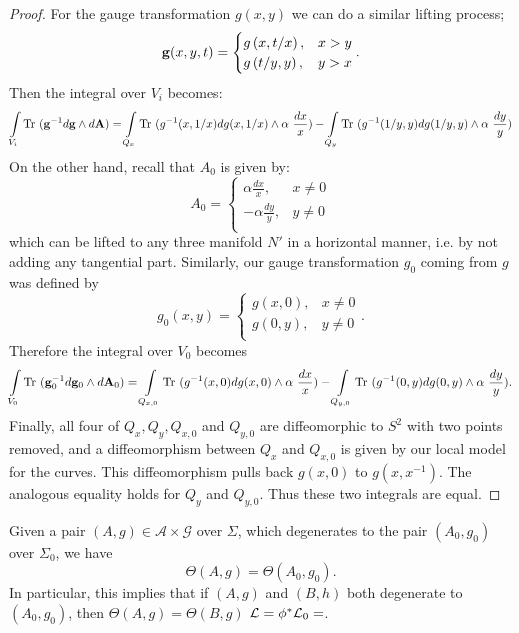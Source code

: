 \begin{proof}
		For the gauge transformation $g(x,y)$ we can do a similar lifting process;
		\begin{equation}
			\mathbf{g}(x,y,t) =\begin{cases}
			g\left(x,t/x\right), & x>y\\
			g\left(t/y,y\right), & y>x\\
			\end{cases}.
		\end{equation}
		Then the integral over $V_i$ becomes:
		\begin{align*}
			\int\limits_{V_i} \text{Tr }(\mathbf{g}^{-1}d\mathbf{g}\wedge d\mathbf{A}) = \int\limits_{Q_x} \text{Tr }(g^{-1}(x,1/x)dg(x,1/x)\wedge \alpha~ \frac{dx}{x}) - \int\limits_{Q_y} \text{Tr }(g^{-1}(1/y,y)dg(1/y,y)\wedge \alpha~ \frac{dy}{y})
		\end{align*}
		On the other hand, recall that $A_0$ is given by:
		\begin{equation}
			A_0 = \begin{cases}
			\alpha \frac{dx}{x}, & x\neq 0\\
			-\alpha \frac{dy}{y}, & y\neq 0\\
			\end{cases}
		\end{equation}
		which can be lifted to any three manifold $N'$ in a horizontal manner, i.e. by not adding any tangential part. Similarly, our gauge transformation $g_0$ coming from $g$ was defined by 
		\begin{equation}
		g_0(x,y) =\begin{cases}
		g\left(x,0\right), & x\neq 0\\
		g\left(0,y\right), & y \neq 0 \\
		\end{cases}.
		\end{equation}
		Therefore the integral over $V_0$ becomes
		\begin{align*}
		\int\limits_{V_0} \text{Tr }(\mathbf{g}_0^{-1}d\mathbf{g}_0\wedge d\mathbf{A}_0) = \int\limits_{Q_{x,0}} \text{Tr }(g^{-1}(x,0)dg(x,0)\wedge \alpha~ \frac{dx}{x}) - \int\limits_{Q_{y,0}} \text{Tr }(g^{-1}(0,y)dg(0,y)\wedge \alpha~ \frac{dy}{y}).
		\end{align*}
		Finally, all four of $Q_x,Q_y, Q_{x,0}$ and $Q_{y,0}$ are diffeomorphic to $S^2$ with two points removed, and a diffeomorphism between $Q_x$ and $Q_{x,0}$ is given by our local model for the curves. This diffeomorphism pulls back $g(x,0)$ to $g(x,x^{-1})$. The analogous equality holds for $Q_y$ and $Q_{y,0}$. Thus these two integrals are equal.
	\end{proof}
	\begin{theorem}
		Given a pair $(A,g) \in \mathcal{A}\times\mathcal{G}$ over $\Sigma$, which degenerates to the pair $(A_0, g_0)$ over $\Sigma_0$, we have
		\begin{equation}
			\Theta(A,g) = \Theta(A_0, g_0).
		\end{equation}
		In particular, this implies that if $(A,g)$ and $(B,h)$ both degenerate to $(A_0,g_0)$, then $\Theta(A,g)=\Theta(B,g)$
		 $\mathcal{L} = \phi^\ast \mathcal{L}_0 =$.
		\label{t:l=l0}
	\end{theorem}
